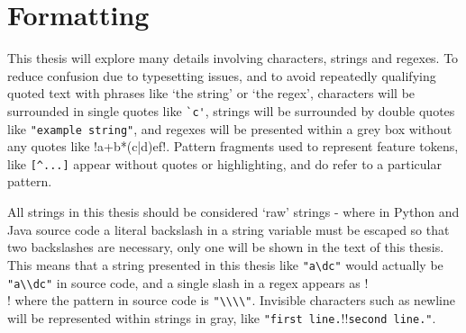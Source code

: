 \section{Formatting}
This thesis will explore many details involving characters, strings and regexes.  To reduce confusion due to typesetting issues, and to avoid repeatedly qualifying quoted text with phrases like `the string' or `the regex', characters will be surrounded in single quotes like \verb!`c'!, strings will be surrounded by double quotes like \verb!"example string"!, and regexes will be presented within a grey box without any quotes like \cverb!a+b*(c|d)e\1f!.  Pattern fragments used to represent feature tokens, like \verb![^...]! appear without quotes or highlighting, and do refer to a particular pattern.

All strings in this thesis should be considered `raw' strings - where in Python and Java source code a literal backslash in a string variable must be escaped so that two backslashes are necessary, only one will be shown in the text of this thesis.  This means that a string presented in this thesis like \verb!"a\dc"! would actually be \verb!"a\\dc"! in source code, and a single slash in a regex appears as \cverb!\\! where the pattern in source code is \verb!"\\\\"!.  Invisible characters such as newline will be represented within strings in gray, like \verb!"first line.!\gverb!\n!\verb!second line."!.
